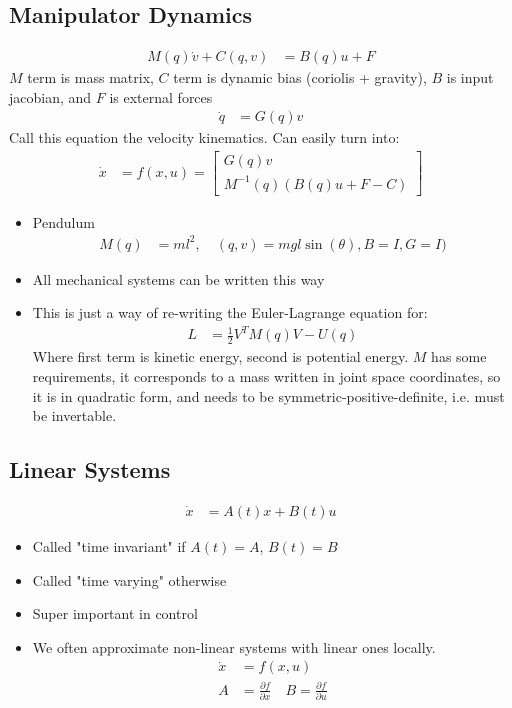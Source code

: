 \documentclass[11pt]{article}
\begin{document}
\subsection{Manipulator Dynamics}
\begin{align*}
    M(q)\dot{v} + C(q,v) &= B(q)u + F
\end{align*}
$M$ term is mass matrix, $C$ term is dynamic bias (coriolis + gravity), $B$ is input jacobian, and $F$ is external forces
\begin{align*}
    \dot{q} &= G(q)v
\end{align*}
Call this equation the velocity kinematics. Can easily turn into:
\begin{align*}
    \dot{x} &= f(x,u) = \begin{bmatrix}
        G(q)v \\
        M^{-1}(q)(B(q)u + F-C)
    \end{bmatrix}
\end{align*}
\begin{itemize}
    \item Pendulum
\begin{align*}
    M(q) &= ml^2, \quad(q,v) = mgl\sin(\theta), B=I, G=I)
\end{align*}
\item All mechanical systems can be written this way
\item This is just a way of re-writing the Euler-Lagrange equation for:
\begin{align*}
    L &= \frac{1}{2} V^TM(q)V - U(q)
\end{align*}
Where first term is kinetic energy, second is potential energy. $M$ has some requirements, it corresponds to a mass written in joint space coordinates, so it is in quadratic form, and needs to be symmetric-positive-definite, i.e. must be invertable. 
\end{itemize}

\subsection{Linear Systems}
\begin{align*}
    \dot{x} &= A(t)x + B(t)u
\end{align*}
\begin{itemize}
    \item Called "time invariant" if $A(t) = A$, $B(t)=B$
    \item Called "time varying" otherwise
    \item Super important in control
    \item We often approximate non-linear systems with linear ones locally.
    \begin{align*}
        \dot{x} &= f(x,u) 
        \\
        A &= \frac{\partial f}{\partial x} \quad B = \frac{\partial f}{\partial u}
    \end{align*}
\end{itemize}
\end{document}
